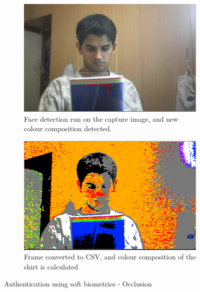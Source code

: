 \documentclass[12pt]{article}			%
\begin{document}
\begin{figure}[h!]
        \begin{subfigure}[b]{0.5\textwidth}
                \centering
                \includegraphics[scale=0.35]{img/soft5.png}
                \caption{Face detection run on the capture image, and new colour composition detected.}
                \label{fig:soft5_org}
        \end{subfigure}%
        \begin{subfigure}[b]{0.5\textwidth}
                \centering
                \includegraphics[scale=0.35]{img/soft5_csv.png}
                \caption{Frame converted to CSV, and colour composition of the shirt is calculated}
                \label{fig:soft5_csv}
        \end{subfigure}
        \caption{Authentication using soft biometrics - Occlusion }\label{fig:soft5}
\end{figure}

\end{document}
